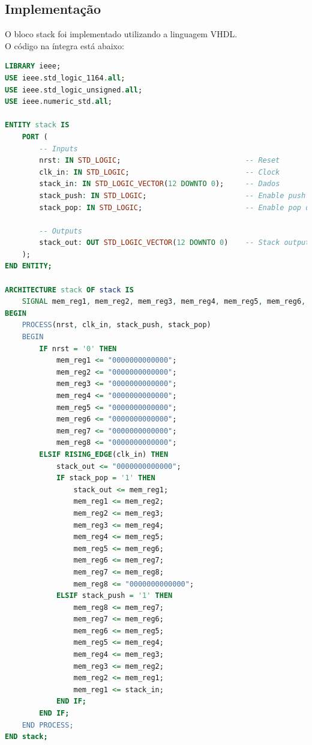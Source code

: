 \documentclass{article}
\begin{document}
\subsection{Implementação}

O bloco stack foi implementado utilizando a linguagem VHDL.\\

O código na íntegra está abaixo:\\

\begin{lstlisting}[language=VHDL, caption={Código VHDL stack}]
LIBRARY ieee;
USE ieee.std_logic_1164.all;
USE ieee.std_logic_unsigned.all;
USE ieee.numeric_std.all;

ENTITY stack IS
    PORT (
        -- Inputs
        nrst: IN STD_LOGIC;                             -- Reset
        clk_in: IN STD_LOGIC;                           -- Clock
        stack_in: IN STD_LOGIC_VECTOR(12 DOWNTO 0);     -- Dados
        stack_push: IN STD_LOGIC;                       -- Enable push op
        stack_pop: IN STD_LOGIC;                        -- Enable pop op
        
        -- Outputs
        stack_out: OUT STD_LOGIC_VECTOR(12 DOWNTO 0)    -- Stack output
    );
END ENTITY;

ARCHITECTURE stack OF stack IS
    SIGNAL mem_reg1, mem_reg2, mem_reg3, mem_reg4, mem_reg5, mem_reg6, mem_reg7, mem_reg8 : STD_LOGIC_VECTOR(12 DOWNTO 0);
BEGIN
    PROCESS(nrst, clk_in, stack_push, stack_pop)
    BEGIN
        IF nrst = '0' THEN
            mem_reg1 <= "0000000000000";
            mem_reg2 <= "0000000000000";
            mem_reg3 <= "0000000000000";
            mem_reg4 <= "0000000000000";
            mem_reg5 <= "0000000000000";
            mem_reg6 <= "0000000000000";
            mem_reg7 <= "0000000000000";
            mem_reg8 <= "0000000000000";
        ELSIF RISING_EDGE(clk_in) THEN
			stack_out <= "0000000000000";
            IF stack_pop = '1' THEN
                stack_out <= mem_reg1;
                mem_reg1 <= mem_reg2;
                mem_reg2 <= mem_reg3;
                mem_reg3 <= mem_reg4;
                mem_reg4 <= mem_reg5;
                mem_reg5 <= mem_reg6;
                mem_reg6 <= mem_reg7;
                mem_reg7 <= mem_reg8;
                mem_reg8 <= "0000000000000";
            ELSIF stack_push = '1' THEN
                mem_reg8 <= mem_reg7;
                mem_reg7 <= mem_reg6;
                mem_reg6 <= mem_reg5;
                mem_reg5 <= mem_reg4;
                mem_reg4 <= mem_reg3;
                mem_reg3 <= mem_reg2;
                mem_reg2 <= mem_reg1;
                mem_reg1 <= stack_in; 
            END IF;
        END IF;
    END PROCESS;
END stack;
\end{lstlisting}
\end{document}
